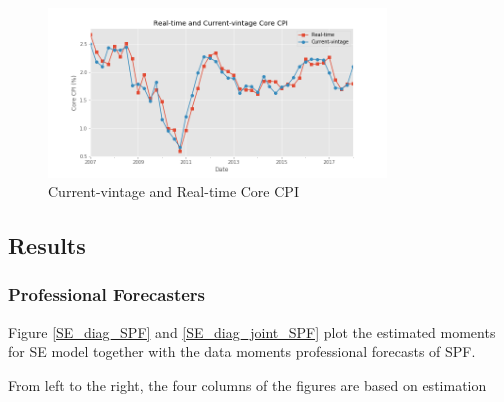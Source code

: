 \documentclass[]{article}
\begin{document}
\begin{figure}[ht]
	\centering
	\includegraphics[width=0.8\textwidth]{figures/ts_rev_realtime.png}
	\caption{Current-vintage and Real-time Core CPI}
	\label{ts_real_time_current_vintage}
\end{figure}

\subsection{Results}

\subsubsection{Professional Forecasters}

Figure \ref{SE_diag_SPF} and \ref{SE_diag_joint_SPF} plot the estimated moments for SE model together with the data moments professional forecasts of SPF. 

From left to the right, the four columns of the figures are based on estimation 
\end{document}

